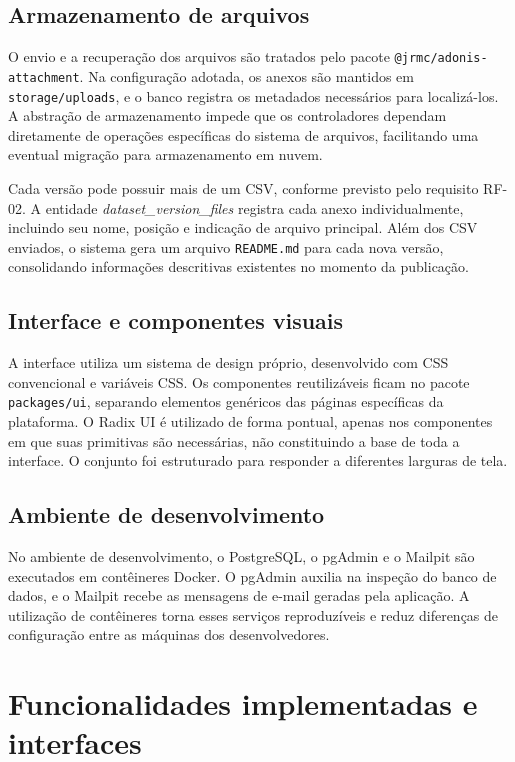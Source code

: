 \subsection{Armazenamento de arquivos}

O envio e a recuperação dos arquivos são tratados pelo pacote \texttt{@jrmc/\allowbreak adonis-\allowbreak attachment}. Na configuração adotada, os anexos são mantidos em \texttt{storage/uploads}, e o banco registra os metadados necessários para localizá-los. A abstração de armazenamento impede que os controladores dependam diretamente de operações específicas do sistema de arquivos, facilitando uma eventual migração para armazenamento em nuvem.

Cada versão pode possuir mais de um CSV, conforme previsto pelo requisito RF-02. A entidade \textit{dataset\_version\_files} registra cada anexo individualmente, incluindo seu nome, posição e indicação de arquivo principal. Além dos CSV enviados, o sistema gera um arquivo \texttt{README.md} para cada nova versão, consolidando informações descritivas existentes no momento da publicação.

\subsection{Interface e componentes visuais}

A interface utiliza um sistema de design próprio, desenvolvido com CSS convencional e variáveis CSS. Os componentes reutilizáveis ficam no pacote \texttt{packages/ui}, separando elementos genéricos das páginas específicas da plataforma. O Radix UI é utilizado de forma pontual, apenas nos componentes em que suas primitivas são necessárias, não constituindo a base de toda a interface. O conjunto foi estruturado para responder a diferentes larguras de tela.

\subsection{Ambiente de desenvolvimento}

No ambiente de desenvolvimento, o PostgreSQL, o pgAdmin e o Mailpit são executados em contêineres Docker. O pgAdmin auxilia na inspeção do banco de dados, e o Mailpit recebe as mensagens de e-mail geradas pela aplicação. A utilização de contêineres torna esses serviços reproduzíveis e reduz diferenças de configuração entre as máquinas dos desenvolvedores.

\section{Funcionalidades implementadas e interfaces}\label{sec:fluxos}


